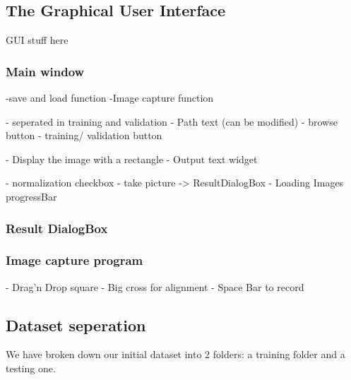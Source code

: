 \subsection{The Graphical User Interface}

GUI stuff here

\subsubsection{Main window}

-save and load function
-Image capture function

- seperated in training and validation
- Path text (can be modified)
- browse button
- training/ validation button

- Display the image with a rectangle
- Output text widget

- normalization checkbox
- take picture -> ResultDialogBox
- Loading Images progressBar

\subsubsection{Result DialogBox}

\subsubsection{Image capture program}
- Drag'n Drop square
- Big cross for alignment
- Space Bar to record


\subsection{Dataset seperation}

We have broken down our initial dataset into 2 folders: a training folder and a testing one.

